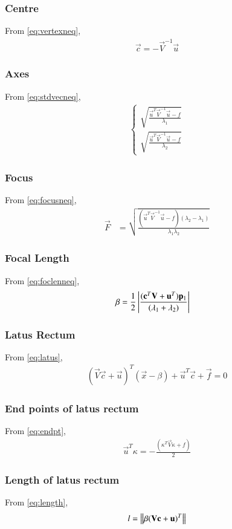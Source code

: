 \documentclass[journal,12pt,twocolumn]{IEEEtran}
\begin{document}
\subsubsection{Centre}
From \eqref{eq:vertexneq},
\begin{align}
    \vec{c} = -\vec{V}^{-1}\vec{u}
\end{align}
\subsubsection{Axes}
From \eqref{eq:stdvecneq},
\begin{align}
\begin{cases}
    \sqrt{\frac{\vec{u}^T\vec{V}^{-1}\vec{u}-f}{\lambda_1}}
    \\
    \sqrt{\frac{\vec{u}^T\vec{V}^{-1}\vec{u}-f}{\lambda_2}}
\end{cases}
\end{align}
\subsubsection{Focus}
From \eqref{eq:focusneq},
\begin{align}
    \vec{F} &= \sqrt{\frac{(\vec{u}^T\vec{V}^{-1}\vec{u}-f)(\lambda_2-\lambda_1)}{\lambda_1\lambda_2}}
\end{align}
\subsubsection{Focal Length}
From \eqref{eq:foclenneq},
\begin{align}
    \beta &= \frac{1}{2}\left\vert\frac{(\mathbf{c}^T\mathbf{V}+\mathbf{u}^T)\mathbf{p}_1}{(\lambda_1+\lambda_2)}\right\vert 
\end{align}
\subsubsection{Latus Rectum}
From \eqref{eq:latus},
\begin{align}
    (\vec{V}\vec{c}+\vec{u})^T(\vec{x} -\beta) + \vec{u}^T\vec{c} + \vec{f} = 0
\end{align}
\subsubsection{End points of latus rectum}
From \eqref{eq:endpt},
\begin{align}
    \vec{u}^T\kappa = -\frac{(\kappa^T\vec{V}\kappa + f )}{2}
\end{align}
\subsubsection{Length of latus rectum}
From \eqref{eq:length},
\begin{align}
   l=\left\lVert\beta(\mathbf{V}\mathbf{c}+\mathbf{u})^T\right\rVert 
\end{align}
\end{document}
